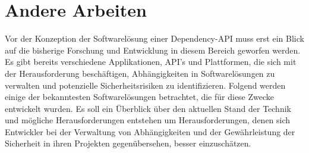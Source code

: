 \section{Andere Arbeiten} \label{sec:Andere}
Vor der Konzeption der Softwarelösung einer Dependency-API muss erst ein Blick auf die bisherige Forschung und Entwicklung in diesem Bereich geworfen werden.
Es gibt bereits verschiedene Applikationen, API's und Plattformen, die sich mit der Herausforderung beschäftigen, Abhängigkeiten in Softwarelösungen zu verwalten und potenzielle Sicherheitsrisiken zu identifizieren.
Folgend werden einige der bekanntesten Softwarelösungen betrachtet, die für diese Zwecke entwickelt wurden.
Es soll ein Überblick über den aktuellen Stand der Technik und mögliche Herausforderungen entstehen um Herausforderungen, denen sich Entwickler bei der Verwaltung von Abhängigkeiten und der Gewährleistung der Sicherheit in ihren Projekten gegenübersehen, besser einzuschätzen.



